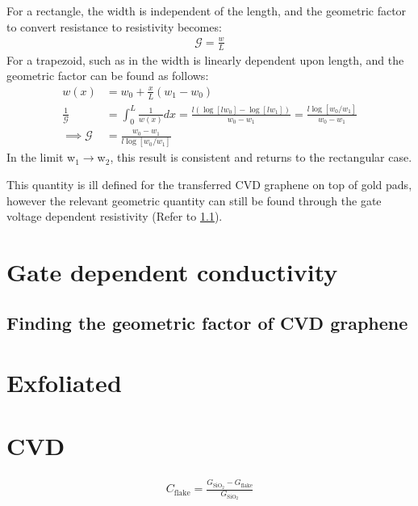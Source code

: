 \documentclass[../Matt_Gebert_Honours_Thesis.tex]{subfiles}
\begin{document}
For a rectangle, the width is independent of the length, and the geometric factor to convert resistance to resistivity becomes:
\begin{align}
\mathcal{G} = \frac{w}{L}
\end{align}
For a trapezoid, such as in  the width is linearly dependent upon length, and the geometric factor can be found as follows:
\begin{align}
	w(x) &= w_0 + \frac{x}{L}(w_1 - w_0)\\
	\frac{1}{\mathcal{G}} &= \int_{0}^{L}\frac{1}{w(x)}dx = \frac{l \left(\log\left[l w_0\right] - \log\left[l w_1\right]\right)}{w_0-w_1} = \frac{l \log\left[w_0/w_1\right]}{w_0-w_1}\\
	\implies \mathcal{G} &= \frac{w_0-w_1}{l \log\left[w_0 / w_1\right]}
\end{align}
In the limit w$_1\to$w$_2$, this result is consistent and returns to the rectangular case.

This quantity is ill defined for the transferred CVD graphene on top of gold pads, however the relevant geometric quantity can still be found through the gate voltage dependent resistivity (Refer to \cref{sec:findinggeometricfactor}).



\section{Gate dependent conductivity}

\subsection{Finding the geometric factor of CVD graphene}\label{sec:findinggeometricfactor}


\section{Exfoliated}\label{sec:pristine_exfoliated}



\section{CVD}\label{sec:pristine_cvd}

\begin{align}
	C_{\text{flake}} = \frac{G_{\text{SiO}_2}-G_{\text{flake}}}{G_{\text{SiO}_2}}
\end{align}
\end{document}

